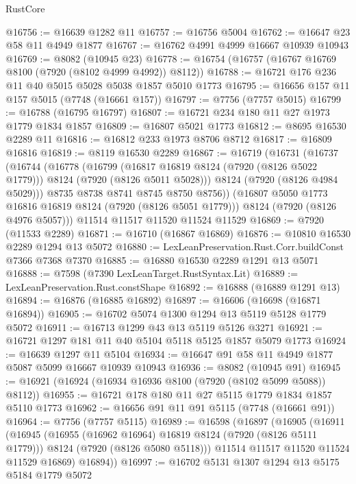 \begin{lexlean}{RustCore}
\begin{coremodule}
@16756 := @16639 @1282 @11
@16757 := @16756 @5004
@16762 := @16647 @23 @58 @11 @4949 @1877
@16767 := @16762 @4991 @4999 @16667 @10939 @10943
@16769 := @8082 (@10945 @23)
@16778 := @16754 (@16757 (@16767 @16769 @8100 (@7920 (@8102 @4999 @4992)) @8112))
@16788 := @16721 @176 @236 @11 @40 @5015 @5028 @5038 @1857 @5010 @1773
@16795 := @16656 @157 @11 @157 @5015 (@7748 (@16661 @157))
@16797 := @7756 (@7757 @5015)
@16799 := @16788 (@16795 @16797)
@16807 := @16721 @234 @180 @11 @27 @1973 @1779 @1834 @1857
@16809 := @16807 @5021 @1773
@16812 := @8695 @16530 @2289 @11
@16816 := @16812 @233 @1973 @8706 @8712
@16817 := @16809 @16816
@16819 := @8119 @16530 @2289
@16867 := @16719
    (@16731
      (@16737
        (@16744
          (@16778
            (@16799
              (@16817 @16819 @8124 (@7920 (@8126 @5022 @1779)))
              @8124
              (@7920 (@8126 @5011 @5028)))
            @8124
            (@7920 (@8126 @4984 @5029)))
          @8735
          @8738
          @8741
          @8745
          @8750
          @8756))
      (@16807 @5050 @1773 @16816 @16819 @8124 (@7920 (@8126 @5051 @1779)))
      @8124
      (@7920 (@8126 @4976 @5057)))
    @11514
    @11517
    @11520
    @11524
    @11529
@16869 := @7920 (@11533 @2289)
@16871 := @16710 (@16867 @16869)
@16876 := @10810 @16530 @2289 @1294 @13 @5072
@16880 := LexLeanPreservation.Rust.Corr.buildConst @7366 @7368 @7370
@16885 := @16880 @16530 @2289 @1291 @13 @5071
@16888 := @7598 (@7390 LexLeanTarget.RustSyntax.Lit)
@16889 := LexLeanPreservation.Rust.constShape
@16892 := @16888 (@16889 @1291 @13)
@16894 := @16876 (@16885 @16892)
@16897 := @16606 (@16698 (@16871 @16894))
@16905 := @16702 @5074 @1300 @1294 @13 @5119 @5128 @1779 @5072
@16911 := @16713 @1299 @43 @13 @5119 @5126 @3271
@16921 := @16721 @1297 @181 @11 @40 @5104 @5118 @5125 @1857 @5079 @1773
@16924 := @16639 @1297 @11 @5104
@16934 := @16647 @91 @58 @11 @4949 @1877 @5087 @5099 @16667 @10939 @10943
@16936 := @8082 (@10945 @91)
@16945 := @16921 (@16924 (@16934 @16936 @8100 (@7920 (@8102 @5099 @5088)) @8112))
@16955 := @16721 @178 @180 @11 @27 @5115 @1779 @1834 @1857 @5110 @1773
@16962 := @16656 @91 @11 @91 @5115 (@7748 (@16661 @91))
@16964 := @7756 (@7757 @5115)
@16989 := @16598
    (@16897
      (@16905
        (@16911
          (@16945
            (@16955 (@16962 @16964) @16819 @8124 (@7920 (@8126 @5111 @1779)))
            @8124
            (@7920 (@8126 @5080 @5118)))
          @11514
          @11517
          @11520
          @11524
          @11529
          @16869)
        @16894))
@16997 := @16702 @5131 @1307 @1294 @13 @5175 @5184 @1779 @5072

\end{coremodule}
\end{lexlean}
